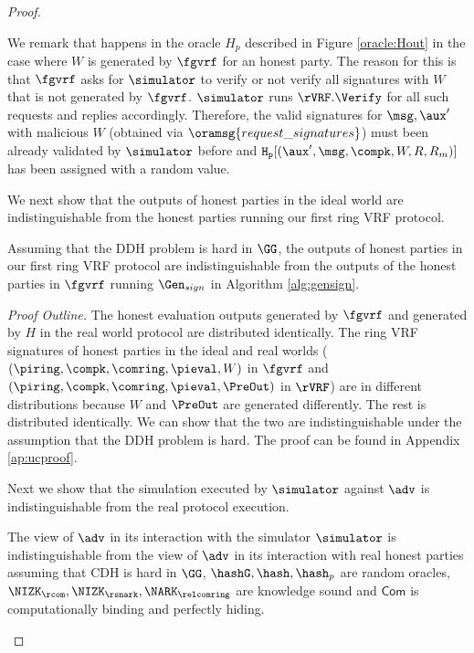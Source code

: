 \begin{proof}
\begin{itemize}
\begin{itemize}
		\end{itemize}
		
		
		
		
		
		
	\end{itemize}
	
	We remark that  happens in the oracle $ H_p $ described in Figure \ref{oracle:Hout} in the case where $ W $ is generated by $ \fgvrf $ for an honest party. The reason for this is that $ \fgvrf $ asks for $ \simulator $ to verify or not verify all signatures with  $ W $ that is not generated by $ \fgvrf $. $ \simulator $ runs $ \rVRF.\Verify $ for all such requests and replies accordingly. Therefore, the valid signatures for $ \msg, \aux' $ with malicious $ W $ (obtained via $ \oramsg{request\_signatures} $) must been already validated by $ \simulator $ before and $ \mathtt{H_p}[(\aux', \msg,\compk,W,R,R_m)] $ has been assigned with a random value. 
	
	We next show that the outputs of honest parties in the ideal world are indistinguishable from the honest parties running our first  ring VRF protocol.
	
	\begin{lemma}\label{lem:honestoutput}
		Assuming that the DDH problem is hard in $ \GG $, the outputs of honest parties in  our first ring VRF protocol are indistinguishable from the outputs of the honest parties in $ \fgvrf $ running $ \Gen_{sign} $  in Algorithm \ref{alg:gensign}.
	\end{lemma}

	\noindent \textit{Proof Outline.} 	The honest evaluation outputs generated by $ \fgvrf $ and generated by $ H $ in the real world protocol are distributed identically. The ring VRF signatures of honest parties in the ideal and real worlds ($ (\piring, \allowbreak \compk, \allowbreak \comring, \pieval, W) $ in $ \fgvrf $ and $ (\piring, \compk, \comring, \pieval, \PreOut) $ in $ \rVRF $) are in different distributions because $ W $ and $ \PreOut $ are generated differently. The rest is distributed identically. We can show that the two are indistinguishable under the assumption that the DDH problem is hard. The proof can be found in Appendix \ref{ap:ucproof}.
	
	
	Next we show that the simulation executed by $ \simulator $ against $ \adv $ is indistinguishable from the real protocol execution.
	
	\begin{lemma} \label{lem:simulation-ind}
		The view of $ \adv $ in its interaction with the simulator $ \simulator $ is indistinguishable from the view of $ \adv $ in its interaction with real honest parties assuming that CDH is hard in $ \GG $, $\hashG, \hash, \hash_p $ are random oracles, $ \NIZK_{\rcom}, \NIZK_{\rsnark}, \NARK_{\relcomring} $ are knowledge sound and $ \mathsf{Com} $ is computationally binding and perfectly hiding. 
	\end{lemma}


\end{proof}
